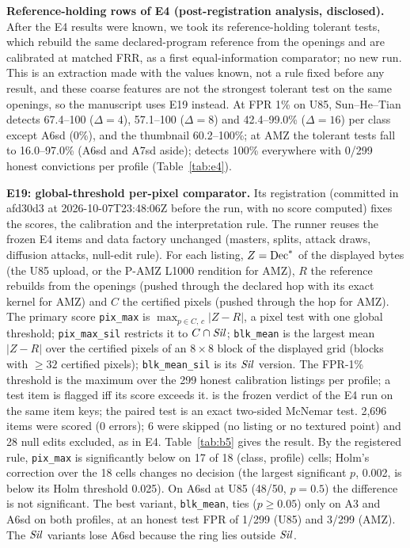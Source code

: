 \documentclass[10pt]{article}
\begin{document}
\textbf{Reference-holding rows of E4 (post-registration analysis, disclosed).} After the E4 results were known, we
took its reference-holding tolerant tests, which rebuild the same declared-program reference from the openings and are
calibrated at matched FRR, as a first equal-information comparator; no new run. This is an extraction made with the
values known, not a rule fixed before any result, and these coarse features are not the strongest tolerant test on the
same openings, so the manuscript uses E19 instead. At FPR 1\% on U85, Sun--He--Tian detects 67.4--100 ($\Delta=4$),
57.1--100 ($\Delta=8$) and 42.4--99.0\% ($\Delta=16$) per class except A6sd (0\%), and the thumbnail 60.2--100\%; at AMZ
the tolerant tests fall to 16.0--97.0\% (A6sd and A7sd aside); \sys{} detects 100\% everywhere with 0/299 honest
convictions per profile (Table~\ref{tab:e4}).

\textbf{E19: global-threshold per-pixel comparator.} Its registration (committed in afd30d3 at 2026-10-07T23:48:06Z before the
run, with no score computed) fixes the scores, the calibration and the interpretation rule. The runner reuses the frozen
E4 items and data factory unchanged (masters, splits, attack draws, diffusion attacks, null-edit rule). For each
listing, $Z=\mathrm{Dec}^{*}$ of the displayed bytes (the U85 upload, or the P-AMZ L1000 rendition for AMZ), $R$ the reference
\sys{} rebuilds from the openings (pushed through the declared hop with its exact kernel for AMZ) and $C$ the certified
pixels (pushed through the hop for AMZ). The primary score \texttt{pix\_max} is $\max_{p\in C,\,c}|Z-R|$, a pixel test
with one global threshold; \texttt{pix\_max\_sil} restricts it to $C\cap\mathit{Sil}$; \texttt{blk\_mean} is the largest mean
$|Z-R|$ over the certified pixels of an $8\times8$ block of the displayed grid (blocks with $\ge32$ certified pixels);
\texttt{blk\_mean\_sil} is its $\mathit{Sil}$ version. The FPR-1\% threshold is the maximum over the 299 honest calibration
listings per profile; a test item is flagged iff its score exceeds it. \sys{} is the frozen \tierXa{} verdict of the E4 run
on the same item keys; the paired test is an exact two-sided McNemar test. 2,696 items were scored (0 errors); 6 were
skipped (no listing or no textured point) and 28 null edits excluded, as in E4. Table~\ref{tab:b5} gives the result.
By the registered rule, \texttt{pix\_max} is significantly below \sys{} on 17 of 18 (class, profile) cells; Holm's
correction over the 18 cells changes no decision (the largest significant $p$, 0.002, is below its Holm threshold
0.025). On A6sd at U85 (48/50, $p=0.5$) the difference is not significant. The best variant, \texttt{blk\_mean}, ties
\sys{} ($p\ge0.05$) only on A3 and A6sd on both profiles, at an honest test FPR of 1/299 (U85) and 3/299 (AMZ). The
$\mathit{Sil}$ variants lose A6sd because the ring lies outside $\mathit{Sil}$.
\end{document}
